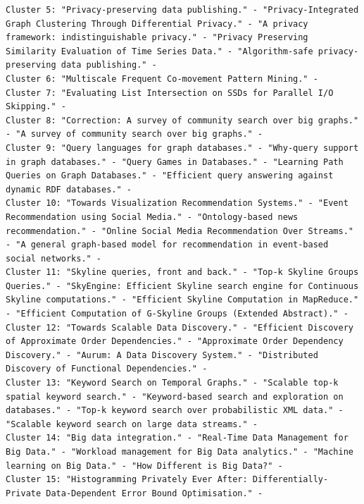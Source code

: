 \documentclass[a4paper,fontsize=11pt]{article}
\begin{document}
\begin{lstlisting}[caption={KMeans output},label={lst:output},breaklines]
Cluster 5: "Privacy-preserving data publishing." - "Privacy-Integrated Graph Clustering Through Differential Privacy." - "A privacy framework: indistinguishable privacy." - "Privacy Preserving Similarity Evaluation of Time Series Data." - "Algorithm-safe privacy-preserving data publishing." - 
Cluster 6: "Multiscale Frequent Co-movement Pattern Mining." - 
Cluster 7: "Evaluating List Intersection on SSDs for Parallel I/O Skipping." - 
Cluster 8: "Correction: A survey of community search over big graphs." - "A survey of community search over big graphs." - 
Cluster 9: "Query languages for graph databases." - "Why-query support in graph databases." - "Query Games in Databases." - "Learning Path Queries on Graph Databases." - "Efficient query answering against dynamic RDF databases." - 
Cluster 10: "Towards Visualization Recommendation Systems." - "Event Recommendation using Social Media." - "Ontology-based news recommendation." - "Online Social Media Recommendation Over Streams." - "A general graph-based model for recommendation in event-based social networks." - 
Cluster 11: "Skyline queries, front and back." - "Top-k Skyline Groups Queries." - "SkyEngine: Efficient Skyline search engine for Continuous Skyline computations." - "Efficient Skyline Computation in MapReduce." - "Efficient Computation of G-Skyline Groups (Extended Abstract)." - 
Cluster 12: "Towards Scalable Data Discovery." - "Efficient Discovery of Approximate Order Dependencies." - "Approximate Order Dependency Discovery." - "Aurum: A Data Discovery System." - "Distributed Discovery of Functional Dependencies." - 
Cluster 13: "Keyword Search on Temporal Graphs." - "Scalable top-k spatial keyword search." - "Keyword-based search and exploration on databases." - "Top-k keyword search over probabilistic XML data." - "Scalable keyword search on large data streams." - 
Cluster 14: "Big data integration." - "Real-Time Data Management for Big Data." - "Workload management for Big Data analytics." - "Machine learning on Big Data." - "How Different is Big Data?" - 
Cluster 15: "Histogramming Privately Ever After: Differentially-Private Data-Dependent Error Bound Optimisation." - 
\end{lstlisting}
\end{document}
